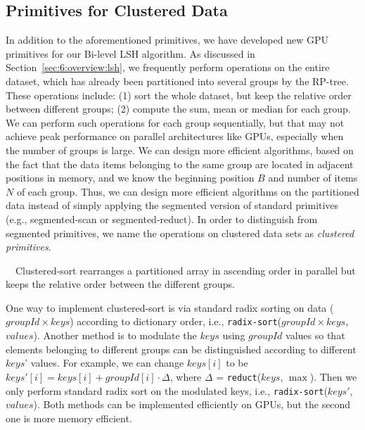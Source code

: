 \subsection{Primitives for Clustered Data}
In addition to the aforementioned primitives, we have developed new GPU primitives for our Bi-level LSH algorithm. As discussed in Section~\ref{sec:6:overview:lsh}, we frequently perform operations
on the entire dataset, which has already been partitioned into several groups by the RP-tree. These operations include: (1) sort the whole
dataset, but keep the relative order between different groups; (2) compute the sum, mean or median for each group. We can perform such operations for each group sequentially, but that may not achieve peak performance on parallel architectures like GPUs, especially when the number of groups is large. We can design more efficient algorithms, based on the fact that the data items belonging to the same group are located in adjacent positions in memory, and we know the beginning position $B$ and number of items $N$ of each group. Thus, we can design more efficient algorithms on the partitioned data instead of simply applying the segmented version of standard primitives (e.g., segmented-scan or segmented-reduct). In order to distinguish from segmented primitives, we name the operations on clustered data sets as \emph{clustered primitives}.

 \ \ Clustered-sort rearranges a partitioned array in ascending order in parallel but keeps the relative order between the different groups.

\vspace{15px}
\noindent {}
\vspace{15px}

One way to implement clustered-sort is via standard radix sorting on data ($groupId \times keys$) according to dictionary order, i.e., \texttt{radix-sort}($groupId \times keys$, $values$). Another method is to modulate the $keys$ using $groupId$ values so that elements belonging to different groups can be distinguished according to different $keys$' values. For example, we can change $keys[i]$ to be $keys'[i] = keys[i] + groupId[i] \cdot \Delta$, where $\Delta$ = \texttt{reduct}($keys$, $\max$). Then we only perform standard radix sort on the modulated keys, i.e., \texttt{radix-sort}($keys'$, $values$). Both methods can be implemented efficiently on GPUs, but the second one is more memory efficient.

